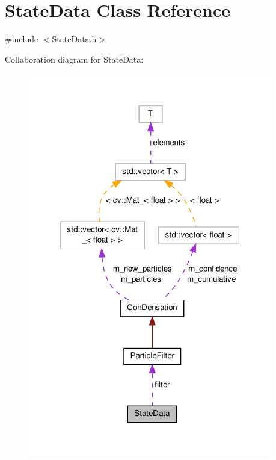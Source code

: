 \hypertarget{classStateData}{\section{State\-Data Class Reference}
\label{classStateData}
}


{\ttfamily \#include $<$State\-Data.\-h$>$}



Collaboration diagram for State\-Data\-:
\nopagebreak
\begin{figure}[H]
\begin{center}
\leavevmode
\includegraphics[width=302pt]{classStateData__coll__graph}
\end{center}
\end{figure}
